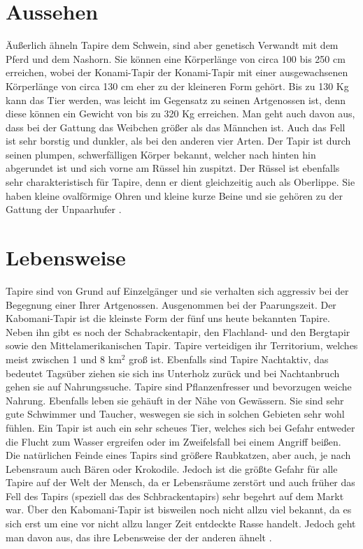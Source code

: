 \documentclass[12pt,a4paper,bibliography=totoc]{scrreprt}
\begin{document}
\section{Aussehen}
Äußerlich ähneln Tapire dem Schwein, sind aber genetisch Verwandt mit dem Pferd und dem Nashorn. Sie können eine Körperlänge von circa 100 bis 250 cm erreichen, wobei der Konami-Tapir der Konami-Tapir mit einer ausgewachsenen Körperlänge von circa 130 cm eher zu der kleineren Form gehört. Bis zu 130 Kg kann das Tier werden, was leicht im Gegensatz zu seinen Artgenossen ist, denn diese können ein Gewicht von bis zu 320 Kg erreichen. Man geht auch davon aus, dass bei der Gattung das Weibchen größer als das Männchen ist. Auch das Fell ist  sehr borstig und dunkler, als bei den anderen vier Arten. 
Der Tapir ist durch seinen plumpen, schwerfälligen Körper bekannt, welcher nach hinten hin abgerundet ist und sich vorne am Rüssel hin zuspitzt. Der Rüssel ist ebenfalls sehr charakteristisch für Tapire, denn er dient gleichzeitig auch als Oberlippe. Sie haben kleine ovalförmige Ohren und kleine kurze Beine und sie gehören zu der Gattung der Unpaarhufer \cite{1}. 




\section{Lebensweise}
Tapire sind von Grund auf Einzelgänger und sie verhalten sich aggressiv bei der Begegnung einer Ihrer Artgenossen. Ausgenommen bei der Paarungszeit. Der Kabomani-Tapir ist die kleinste Form der fünf uns heute bekannten Tapire. Neben ihn gibt es noch der Schabrackentapir, den Flachland- und den Bergtapir sowie den Mittelamerikanischen Tapir. Tapire verteidigen ihr Territorium, welches meist zwischen 1 und 8 km$^{2}$ groß ist. Ebenfalls sind Tapire Nachtaktiv, das bedeutet Tagsüber ziehen sie sich ins Unterholz zurück und bei Nachtanbruch gehen sie auf Nahrungssuche. Tapire sind Pflanzenfresser und bevorzugen weiche Nahrung. Ebenfalls leben sie gehäuft in der Nähe von Gewässern. Sie sind sehr gute Schwimmer und Taucher, weswegen sie sich in solchen Gebieten sehr wohl fühlen. Ein Tapir ist auch ein sehr scheues Tier, welches sich bei Gefahr entweder die Flucht zum Wasser ergreifen oder im Zweifelsfall bei einem Angriff beißen. Die natürlichen Feinde eines Tapirs sind größere Raubkatzen, aber auch, je nach Lebensraum auch Bären oder Krokodile. Jedoch ist die größte Gefahr für alle Tapire auf der Welt der Mensch, da er Lebensräume zerstört und auch früher das Fell des Tapirs (speziell das des Schbrackentapirs) sehr begehrt auf dem Markt war.
Über den Kabomani-Tapir ist bisweilen noch nicht allzu viel bekannt, da es sich erst um eine vor nicht allzu langer Zeit entdeckte Rasse handelt. Jedoch geht man davon aus, das ihre Lebensweise der der anderen ähnelt \cite{2}. 
\end{document}
